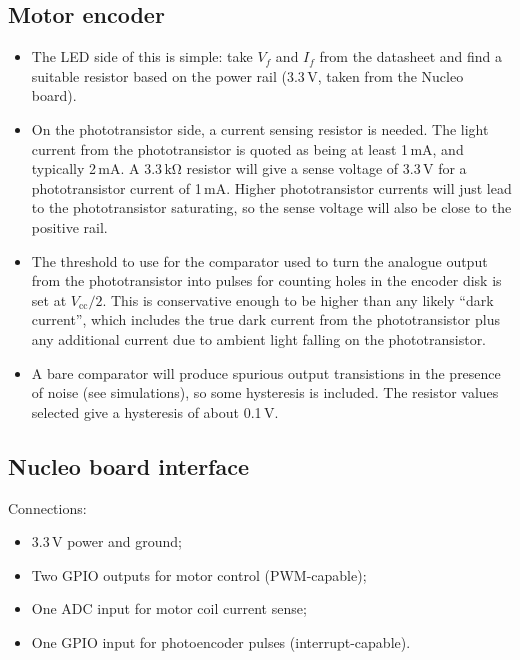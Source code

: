 \documentclass[a4paper,11pt,article]{memoir}
\begin{document}
\subsection*{Motor encoder}

\begin{itemize}
  \item{The LED side of this is simple: take $V_f$ and $I_f$ from the
    datasheet and find a suitable resistor based on the power rail
    (3.3\,V, taken from the Nucleo board).}
  \item{On the phototransistor side, a current sensing resistor is
    needed. The light current from the phototransistor is quoted as
    being at least 1\,mA, and typically 2\,mA. A
    $3.3\,\mathrm{k\Omega}$ resistor will give a sense voltage of
    3.3\,V for a phototransistor current of 1\,mA. Higher
    phototransistor currents will just lead to the phototransistor
    saturating, so the sense voltage will also be close to the
    positive rail.}
  \item{The threshold to use for the comparator used to turn the
    analogue output from the phototransistor into pulses for counting
    holes in the encoder disk is set at $V_{\mathrm{cc}} / 2$. This is
    conservative enough to be higher than any likely ``dark current'',
    which includes the true dark current from the phototransistor plus
    any additional current due to ambient light falling on the
    phototransistor.}
  \item{A bare comparator will produce spurious output transistions in
    the presence of noise (see simulations), so some hysteresis is
    included. The resistor values selected give a hysteresis of about
    0.1\,V.}
\end{itemize}

\subsection*{Nucleo board interface}

Connections:
\begin{itemize}
  \item{3.3\,V power and ground;}
  \item{Two GPIO outputs for motor control (PWM-capable);}
  \item{One ADC input for motor coil current sense;}
  \item{One GPIO input for photoencoder pulses (interrupt-capable).}
\end{itemize}
\end{document}
